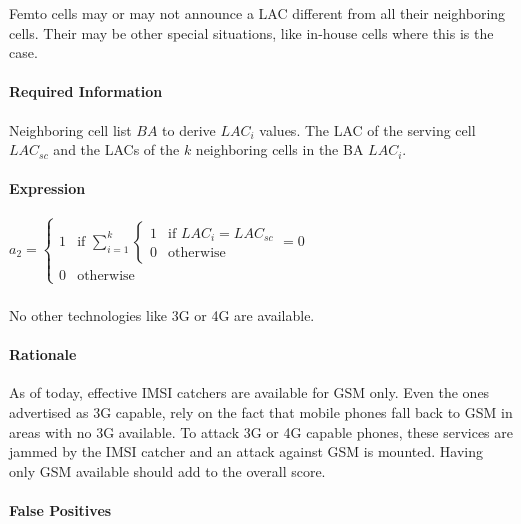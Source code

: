 \documentclass[a4paper,11pt,notitlepage,bigheadings,oneside]{scrartcl}
\begin{document}
Femto cells may or may not announce a LAC different from all their neighboring
cells. Their may be other special situations, like in-house cells where this is
the case.

\paragraph{Required Information}

Neighboring cell list $BA$ to derive $LAC_i$ values. The LAC of the serving
cell $LAC_{sc}$ and the LACs of the $k$ neighboring cells in the BA $LAC_i$.

\paragraph{Expression}

$a_2 =
\begin{cases}
	1 & \text{if } \displaystyle\sum_{i=1}^{k}
                        \begin{cases}
	                        1 & \text{if } LAC_i = LAC_{sc} \\
	                        0 & \text{otherwise}
                        \end{cases} = 0\\
        0 & \text{otherwise}
        \end{cases}
$
        
\subsubsection{}

No other technologies like 3G or 4G are available.

\paragraph{Rationale}

As of today, effective IMSI catchers are available for GSM only. Even the ones
advertised as 3G capable, rely on the fact that mobile phones fall back to GSM
in areas with no 3G available. To attack 3G or 4G capable phones, these
services are jammed by the IMSI catcher and an attack against GSM is mounted.
Having only GSM available should add to the overall score.

\paragraph{False Positives}
\end{document}
